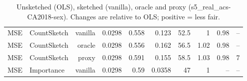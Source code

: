\begin{table}[t]
\begin{tabular}{llrrrrrrrr}
MSE & CountSketch & vanilla & 0.0298 & 0.558 & 0.123 & 52.5 & 1 & 0.98 & -- \\
MSE & CountSketch & oracle & 0.0298 & 0.556 & 0.162 & 56.5 & 1.02 & 0.98 & -- \\
MSE & CountSketch & proxy & 0.0298 & 0.591 & 0.155 & 58.5 & 1.03 & 0.98 & 7 \\
MSE & Importance & vanilla & 0.0298 & 0.59 & 0.0358 & 47 & 1 & -- & -- \\
\bottomrule
\end{tabular}
\caption{Unsketched (OLS), sketched (vanilla), oracle and proxy (s5_real_acs-CA2018-sex). Changes are relative to OLS; positive = less fair.}
\label{tab:strat_s5_real_acs-CA2018-sex}
\end{table}
